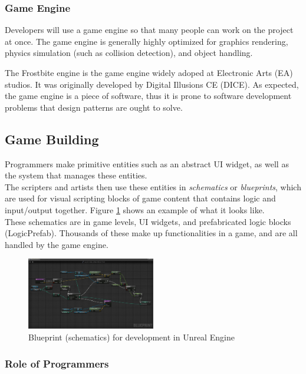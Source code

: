 \documentclass[10pt,letterpaper]{article}
\newcommand{\bs}{\bigskip}
\begin{document}
\begin{multicols}{2}
\subsubsection{Game Engine}
Developers will use a game engine so that many people can work on the project at once. The game engine is generally highly optimized for graphics rendering, physics simulation (such as collision detection), and object handling.\bs

The Frostbite engine is the game engine widely adoped at Electronic Arts (EA) studios. It was originally developed by Digital Illusions CE (DICE).\cite{frostbite}\cite{frostbite-wiki} As expected, the game engine is a piece of software, thus it is prone to software development problems that design patterns are ought to solve.

\subsection{Game Building}

Programmers make primitive entities such as an abstract UI widget, as well as the system that manages these entities.\bs
\\
The scripters and artists then use these entities in \textit{schematics} or \textit{blueprints}, which are used for visual scripting blocks of game content that contains logic and input/output together. Figure \ref{fig:unreal-blueprint} shows an example of what it looks like.\bs
\\
These schematics are in game levels, UI widgets, and prefabricated logic blocks (LogicPrefab). Thousands of these make up functionalities in a game, and are all handled by the game engine.

\begin{figure}[H]
	\centering
	\includegraphics[width=0.5\textwidth]{assets/unreal-blueprint}
	\caption{Blueprint (schematics) for development in Unreal Engine\cite{unity-vs-unreal}}
	\label{fig:unreal-blueprint}
\end{figure}

\subsubsection{Role of Programmers}


\end{multicols}
\end{document}
